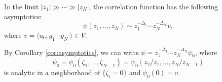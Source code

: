 \begin{corollary}\label{cor:asymptotics}
  In the limit $|z_1| \gg \cdots \gg |z_N|$,
  the correlation function has the following
  asymptotics:
  \[
    \psi(z_1, \dots, z_N)
    \sim z_1^{-\Delta_1} \cdots z_N^{-\Delta_N} v,
  \]
  where $v = \langle u_0, g_1 \cdots g_N \cdot \rangle \in V$.
\end{corollary}

\begin{remark}
  By Corollary \ref{cor:asymptotics}, we
  can write
  $\psi = z_1^{-\Delta_1} \cdots z_N^{-\Delta_N} \psi_0$, where
  \[
    \psi_0
    = \psi_0(\zeta_1, \dots, \zeta_{N - 1})
    = \psi_0(z_2 / z_1, \dots, z_N / z_{N - 1})
  \]
  is analytic in a neighborhood of
  $\{\zeta_i = 0\}$ and $\psi_0(0) = v$.
\end{remark}
